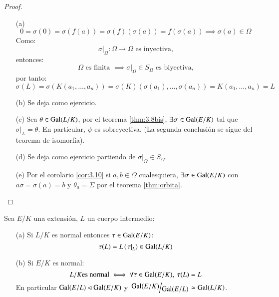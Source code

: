 \begin{proof}$ $
    \begin{itemize}
        \item[(a)]
        $$
            0 = \sigma(0) = \sigma(f(a)) = \sigma(f)(\sigma(a)) = f(\sigma(a)) \implies \sigma(a) \in \Omega
        $$
        Como:
        $$
            \left. \sigma \right|_\Omega: \Omega \to \Omega \text{ es inyectiva,}
        $$
        entonces:
        $$
            \Omega \text{ es finita } \implies \left. \sigma \right|_\Omega \in S_\Omega \text{ es biyectiva,}
        $$
        por tanto:
        $$
            \sigma(L) = \sigma(K(a_1, \ldots, a_n)) = \sigma(K)(\sigma(a_1), \ldots, \sigma(a_n)) = K(a_1, \ldots, a_n) = L
        $$
        \item[(b)] Se deja como ejercicio.
        \item[(c)] Sea $\theta \in \mathrm{Gal}(L/K)$, por el teorema \ref{thm:3.8bis}, $\exists \sigma \in \mathrm{Gal}(E/K)$ tal que $\left. \sigma \right|_L = \theta$. En particular, $\psi$ es sobreyectiva. (La segunda conclusión se sigue del teorema de isomorfía).
        \item[(d)] Se deja como ejercicio partiendo de $\left. \sigma \right|_\Omega \in S_\Omega$.
        \item[(e)] Por el corolario \ref{cor:3.10} si $a, b \in \Omega$ cualesquiera, $\exists \sigma \in \mathrm{Gal}(E/K)$ con $a\sigma = \sigma(a) = b$ y $\theta_a = \Sigma$ por el teorema \ref{thm:orbita}.
    \end{itemize}
\end{proof}


\begin{cor}\label{cor:3.12}
    Sea $E/K$ una extensión, $L$ un cuerpo intermedio:
    \begin{itemize}
        \item[(a)] Si $L/K$ es normal entonces $\tau \in \mathrm{Gal}(E/K)$:
        $$
            \tau(L) = L \left(\left.\tau\right|_L\right) \in \mathrm{Gal}(L/K)
        $$
        \item[(b)] Si $E/K$ es normal:
        $$
            L/K \text{es normal} \iff \forall \tau \in \mathrm{Gal}(E/K),\ \tau(L) = L
        $$
        En particular $\mathrm{Gal}(E/L) \lhd \mathrm{Gal}(E/K)$ y $\quo{\gal(E/K)}{\gal(E/L)} \isom \gal(L/K)$.
    \end{itemize}
\end{cor}

